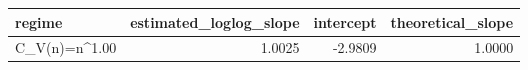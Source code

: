 \begin{tabular}{lrrr}
\toprule
regime & estimated_loglog_slope & intercept & theoretical_slope \\
\midrule
C_V(n)=n^1.00 & 1.0025 & -2.9809 & 1.0000 \\
\bottomrule
\end{tabular}
